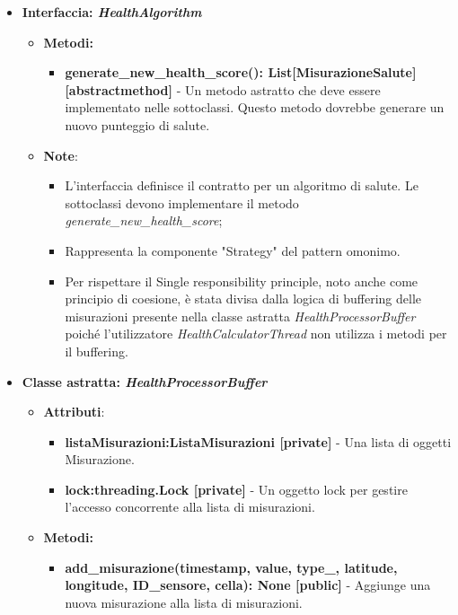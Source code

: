 \begin{itemize}
    \item{\textbf{Interfaccia: \textit{HealthAlgorithm}}}
    \begin{itemize}
    \item \textbf{Metodi: }
    \begin{itemize}
        \item \textbf{generate\_new\_health\_score(): List[MisurazioneSalute] [abstractmethod]} - Un metodo astratto che deve essere implementato nelle sottoclassi. Questo metodo dovrebbe generare un nuovo punteggio di salute.
    \end{itemize}
    \item\textbf{Note}:
        \begin{itemize}
            \item L'interfaccia definisce il contratto per un algoritmo di salute. Le sottoclassi devono implementare il metodo \textit{generate\_new\_health\_score};
            \item Rappresenta la componente "Strategy" del pattern omonimo.
            \item Per rispettare il Single responsibility principle, noto anche come principio di coesione, è stata divisa dalla logica di buffering delle misurazioni presente nella classe astratta \textit{HealthProcessorBuffer} poiché l'utilizzatore \textit{HealthCalculatorThread} non utilizza i metodi per il buffering.
        \end{itemize}
    \end{itemize}
    \item\textbf{Classe astratta: \textit{HealthProcessorBuffer}}
    \begin{itemize}
    \item\textbf{Attributi}:
        \begin{itemize}
        \item \textbf{listaMisurazioni:ListaMisurazioni [private]} - Una lista di oggetti Misurazione.
        \item \textbf{lock:threading.Lock [private]} - Un oggetto lock per gestire l'accesso concorrente alla lista di misurazioni.
    \end{itemize}
    \item \textbf{Metodi: }
    \begin{itemize}
        \item \textbf{add\_misurazione(timestamp, value, type\_, latitude, longitude, ID\_sensore, cella): None [public]} - Aggiunge una nuova misurazione alla lista di misurazioni.

\end{itemize}
\end{itemize}
\end{itemize}
